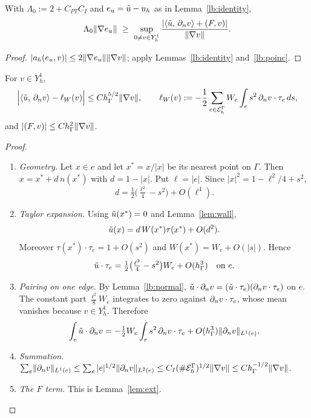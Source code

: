 \begin{corollary}\label{lb:abstract}
With $\Lambda_0:=2+C_{PT}C_I$ and $e_u=\tilde u-u_h$ as in Lemma~\ref{lb:identity},
\[
\Lambda_0\lVert \nabla e_u\rVert\ \ge\ \sup_{0\ne v\in Y_h^1}\frac{|\langle \tilde u,\, \partial_n v\rangle+(F,v)|}{\lVert \nabla v\rVert} .
\]
\end{corollary}

\begin{proof}
$|a_h(e_u,v)|\le2\lVert \nabla e_u\rVert\lVert \nabla v\rVert$; apply Lemmas~\ref{lb:identity} and~\ref{lb:poinc}.
\end{proof}

\begin{lemma}\label{lb:expand}
For $v\in Y_h^1$,
\[
\Bigl|\langle \tilde u,\, \partial_n v\rangle-\ell_W(v)\Bigr|\le Ch_\Gamma^{5/2}\lVert \nabla v\rVert,\qquad \ell_W(v):=-\frac12\sum_{e\in\mathcal E_h^\Gamma}W_e\int_e s^2\,\partial_n v\cdot\tau_e\,ds,
\]
and $|(F,v)|\le Ch_\Gamma^2\lVert \nabla v\rVert$.
\end{lemma}

\begin{proof}
\begin{enumerate}
\item \emph{Geometry.} Let $x\in e$ and let $x^\ast=x/|x|$ be its nearest point on $\Gamma$. Then $x=x^\ast+d\,n(x^\ast)$ with $d=1-|x|$. Put $\ell=|e|$. Since $|x|^2=1-\ell^2/4+s^2$,
\[
d=\tfrac12\bigl(\tfrac{\ell^2}4-s^2\bigr)+O(\ell^4).
\]
\item \emph{Taylor expansion.} Using $\tilde u(x^\ast)=0$ and Lemma~\ref{lem:wall},
\[
\tilde u(x)=d\,W(x^\ast)\tau(x^\ast)+O(d^2).
\]
Moreover $\tau(x^\ast)\cdot\tau_e=1+O(s^2)$ and $W(x^\ast)=W_e+O(|s|)$. Hence
\[
\tilde u\cdot\tau_e=\tfrac12\bigl(\tfrac{\ell^2}{4}-s^2\bigr)W_e+O(h_\Gamma^3)\quad\text{on }e .
\]
\item \emph{Pairing on one edge.} By Lemma~\ref{lb:normal}, $\tilde u\cdot\partial_n v=(\tilde u\cdot\tau_e)(\partial_n v\cdot\tau_e)$ on $e$. The constant part $\frac{\ell^2}{8}W_e$ integrates to zero against $\partial_n v\cdot\tau_e$, whose mean vanishes because $v\in Y_h^1$. Therefore
\[
\int_e\tilde u\cdot\partial_n v=-\tfrac12W_e\int_es^2\,\partial_n v\cdot\tau_e+O(h_\Gamma^3)\lVert \partial_n v\rVert_{L^1(e)} .
\]
\item \emph{Summation.} $\sum_e\lVert \partial_n v\rVert_{L^1(e)}\le\sum_e|e|^{1/2}\lVert \partial_n v\rVert_{L^2(e)}\le C_I(\#\mathcal E_h^\Gamma)^{1/2}\lVert \nabla v\rVert\le Ch_\Gamma^{-1/2}\lVert \nabla v\rVert$.
\item \emph{The $F$ term.} This is Lemma~\ref{lem:ext}.\qedhere
\end{enumerate}
\end{proof}

